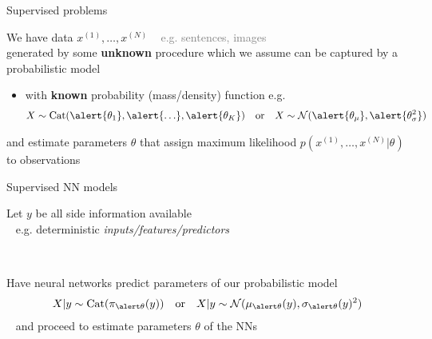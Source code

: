 \documentclass[14pt]{beamer}
\begin{document}
\begin{frame}{Supervised problems}

We have data $x^{(1)}, \ldots,  x^{(N)}$ \textcolor{gray}{~ e.g. sentences, images} \\
generated by some {\bf unknown} procedure 
which we assume can be captured by a probabilistic model


\begin{itemize}
	\item with {\bf known} probability (mass/density) function e.g.
	\begin{align*}
    X \sim \Cat(\alert{\theta_1}, \alert{\ldots}, \alert{\theta_K}) & & \text{or} & & X \sim \mathcal N(\alert{\theta_\mu}, \alert{\theta^2_\sigma})
    \end{align*}    
\end{itemize}
\pause
and \alert{estimate parameters $\theta$}  that assign maximum likelihood $p(x^{(1)}, \ldots, x^{(N)}|\theta)$ to observations

\end{frame}


\begin{frame}{Supervised NN models}

Let $y$ be all side information available\\
~ e.g. deterministic \emph{inputs/features/predictors}

~

Have neural networks predict parameters of our probabilistic model
	\begin{align*}
    X|y \sim \Cat(\pi_{\alert \theta}(y)) & & \text{or} & & X|y \sim \mathcal N(\mu_{\alert \theta}(y), \sigma_{\alert \theta}(y)^2)
    \end{align*}
~ and proceed to \alert{estimate parameters $\theta$}  of the NNs %



\end{frame}
\end{document}
